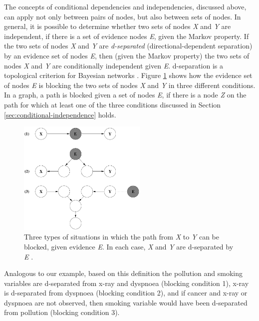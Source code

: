 \documentclass[11pt]{article}
\begin{document}
The concepts of conditional dependencies and independencies, discussed above,
can apply not only between pairs of nodes, but also between sets of nodes. In
general, it is possible to determine whether two sets of nodes \textit{X} and
\textit{Y} are independent, if there is a set of evidence nodes \textit{E},
given the Markov property. If the two sets of nodes \textit{X} and \textit{Y}
are \textit{d-separated} (directional-dependent separation) by an evidence set
of nodes \textit{E}, then (given the Markov property) the two sets of nodes
\textit{X} and \textit{Y} are conditionally independent given \textit{E}.
d-separation is a topological criterion for Bayesian networks
\cite{russell:ai-modern}. Figure \ref{fig:d-separation} shows how the evidence
set of nodes \textit{E} is blocking the two sets of nodes \textit{X} and
\textit{Y} in three different conditions. In a graph, a path is blocked given a
set of nodes \textit{E}, if there is a node \textit{Z} on the path for which at
least one of the three conditions discussed in Section
\ref{sec:conditional-independence} holds.

\begin{figure}[tbh]
  \center
  \includegraphics[width=0.55\textwidth]{figure/d-separation.png}
  \caption{Three types of situations in which the path from \textit{X} to
  \textit{Y} can be blocked, given evidence \textit{E}. In each case, \textit{X}
  and \textit{Y} are d-separated by \textit{E}
  \cite{korb:bayesian-ai}.}
  \label{fig:d-separation}
\end{figure}

Analogous to our example, based on this definition the pollution and smoking
variables are d-separated from x-ray and dyspnoea (blocking condition 1), x-ray
is d-separated from dyspnoea (blocking condition 2), and if cancer and x-ray or
dyspnoea are not observed, then smoking variable would have been d-separated
from pollution (blocking condition 3).
\end{document}
